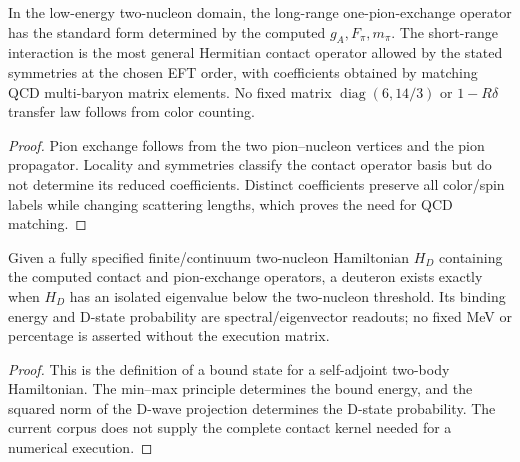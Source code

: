\documentclass[12pt,a4paper]{article}
\begin{document}
\begin{theorem}
\label{p11:thm:native-ope-and-nn-contact-block}

In the low-energy two-nucleon domain, the long-range one-pion-exchange operator has the standard form determined by the computed \(g_A,F_\pi,m_\pi\).  The short-range interaction is the most general Hermitian contact operator allowed by the stated symmetries at the chosen EFT order, with coefficients obtained by matching QCD multi-baryon matrix elements.  No fixed matrix \(\operatorname{diag}(6,14/3)\) or \(1-R\delta\) transfer law follows from color counting.
\label{p11:eq:native-ope-momentum-kernel}
\label{p11:eq:ope-coefficient-number}
\label{p11:eq:nn-contact-r-matrix}
\label{p11:eq:nn-contact-transfer-matrix}
\label{p11:eq:nn-contact-hamiltonian-matrix}
\label{p11:eq:contact-only-threshold-lengths}
\end{theorem}
\begin{proof}

Pion exchange follows from the two pion--nucleon vertices and the pion propagator.  Locality and symmetries classify the contact operator basis but do not determine its reduced coefficients.  Distinct coefficients preserve all color/spin labels while changing scattering lengths, which proves the need for QCD matching.
\end{proof}

\begin{proposition}
\label{p11:prop:leading-deuteron-contact-ope-block}

Given a fully specified finite/continuum two-nucleon Hamiltonian \(H_D\) containing the computed contact and pion-exchange operators, a deuteron exists exactly when \(H_D\) has an isolated eigenvalue below the two-nucleon threshold.  Its binding energy and D-state probability are spectral/eigenvector readouts; no fixed MeV or percentage is asserted without the execution matrix.
\label{p11:eq:leading-deuteron-coupled-hamiltonian}
\label{p11:eq:deuteron-eigenvalue-readout}
\label{p11:eq:leading-deuteron-estimate}
\end{proposition}
\begin{proof}

This is the definition of a bound state for a self-adjoint two-body Hamiltonian.  The min--max principle determines the bound energy, and the squared norm of the D-wave projection determines the D-state probability.  The current corpus does not supply the complete contact kernel needed for a numerical execution.
\end{proof}
\end{document}
